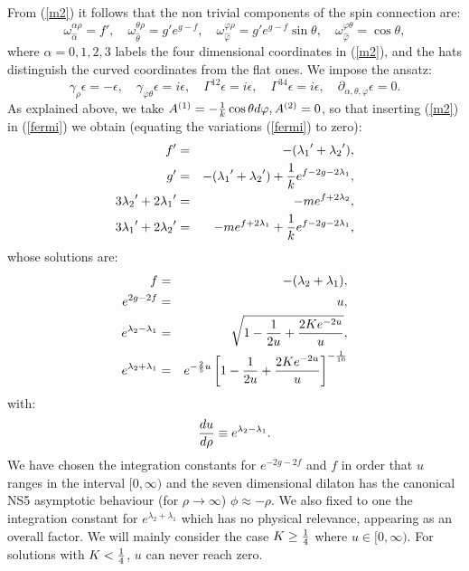 \documentclass[a4paper,12pt]{article}
\begin{document}
From (\ref{m2}) it follows that the non trivial components of the spin connection are:
\begin{equation}
\omega_{\hat{\alpha}}^{\alpha\rho}= f', \quad \omega_{\hat{\theta}}^{\theta\rho}=g'e^{g-f}, \quad \omega_{\hat{\varphi}}^{\varphi\rho}=g'e^{g-f}\sin\theta,  \quad \omega_{\hat{\varphi}}^{\varphi\theta}=\cos\theta,
\label{spinconn}
\end{equation}
where $\alpha=0,1,2,3$ labels the four dimensional coordinates in (\ref{m2}),
and the hats distinguish the curved coordinates from the flat ones. 
We impose the ansatz:
\begin{equation}
\gamma_{\rho}\epsilon = -\epsilon, \quad \gamma_{\varphi\theta}\epsilon=i\epsilon, \quad  \Gamma^{12}\epsilon= i\epsilon, \quad  \Gamma^{34}\epsilon= i\epsilon,\quad  \partial_{\alpha,\theta,\varphi}\epsilon = 0.
\end{equation}
As explained above, we take $A^{(1)}= -{1\over k}\cos\theta d\varphi, A^{(2)}=0$,
so that inserting (\ref{m2}) in (\ref{fermi}) we obtain (equating the variations (\ref{fermi}) to zero):
\begin{eqnarray}
f' &=& -({\lambda_{1}}' +{\lambda_{2}}'),\nonumber \\
g' &=& -({\lambda_{1}}' +{\lambda_{2}}') +{1\over k}e^{f-2g-2\lambda_{1}},\nonumber \\
3{\lambda_{2}}'+2{\lambda_{1}}' &=& -me^{f+2\lambda_{2}},\nonumber \\
3{\lambda_{1}}'+2{\lambda_{2}}' &=& -me^{f+2\lambda_{1}}+{1\over k}e^{f-2g-2\lambda_{1}},
\label{first}
\end{eqnarray}
whose solutions are:
\begin{eqnarray}
f &=& -(\lambda_{2}+\lambda_{1}) ,\nonumber \\
e^{2g-2f} &=& u , \nonumber \\
e^{\lambda_{2}-\lambda_{1}} &=& \sqrt{1-{1\over2u}+ {2Ke^{-2u}\over u}}, \nonumber \\
e^{\lambda_{2}+\lambda_{1}} &=& e^{-{2\over5}u}\left[1-{1\over2u}+ {2Ke^{-2u}\over u}\right]^{-{1\over10}} 
\label{7sol}
\end{eqnarray}
with:
\begin{equation}
{du\over d\rho}\equiv e^{\lambda_{2}-\lambda_{1}}.
\label{u}
\end{equation}
We have chosen the integration constants for $e^{-2g-2f}$ and $f$ in order that $u$ ranges in the interval $[0,\infty)$ and the seven dimensional dilaton has the canonical NS5 asymptotic behaviour (for $\rho\rightarrow\infty$)
$\phi\approx -\rho$. 
We also fixed to one the integration constant for $e^{\lambda_{2}+\lambda_{1}}$ which has no physical relevance, appearing as an overall
factor. We will
mainly consider the case $K\geq {1\over4}$ where $u\in [0,\infty)$.
For solutions with $K<{1\over4}$, $u$ can never reach zero. 
\end{document}
